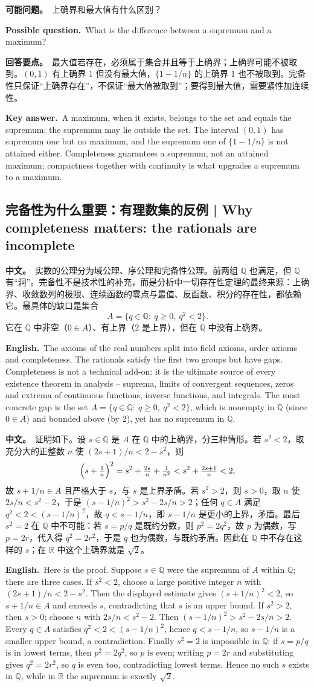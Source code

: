 \documentclass[UTF8,11pt,a4paper]{ctexart}
\newcommand{\BOTH}[2]{\par\noindent\textbf{中文。}\ #1\par\noindent\textbf{English.}\ #2\par}
\newcommand{\ASK}[4]{\begin{samepage}\par\noindent\textbf{可能问题。}\ #1\par\noindent\textbf{Possible question.}\ #2\par\noindent\textbf{回答要点。}\ #3\par\noindent\textbf{Key answer.}\ #4\medskip\end{samepage}}
\begin{document}
\ASK{上确界和最大值有什么区别？}{What is the difference between a supremum and a maximum?}{最大值若存在，必须属于集合并且等于上确界；上确界可能不被取到。$(0,1)$ 有上确界 $1$ 但没有最大值，$\{1-1/n\}$ 的上确界 $1$ 也不被取到。完备性只保证“上确界存在”，不保证“最大值被取到”；要得到最大值，需要紧性加连续性。}{A maximum, when it exists, belongs to the set and equals the supremum; the supremum may lie outside the set. The interval $(0,1)$ has supremum one but no maximum, and the supremum one of $\{1-1/n\}$ is not attained either. Completeness guarantees a supremum, not an attained maximum; compactness together with continuity is what upgrades a supremum to a maximum.}

\subsection{完备性为什么重要：有理数集的反例 | Why completeness matters: the rationals are incomplete}
\BOTH{实数的公理分为域公理、序公理和完备性公理。前两组 $\mathbb Q$ 也满足，但 $\mathbb Q$ 有“洞”。完备性不是技术性的补充，而是分析中一切存在性定理的最终来源：上确界、收敛数列的极限、连续函数的零点与最值、反函数、积分的存在性，都依赖它。最具体的缺口是集合
\[
A=\{q\in\mathbb Q:\ q\ge0,\ q^2<2\}.
\]
它在 $\mathbb Q$ 中非空（$0\in A$）、有上界（$2$ 是上界），但在 $\mathbb Q$ 中没有上确界。}{The axioms of the real numbers split into field axioms, order axioms and completeness. The rationals satisfy the first two groups but have gaps. Completeness is not a technical add-on: it is the ultimate source of every existence theorem in analysis -- suprema, limits of convergent sequences, zeros and extrema of continuous functions, inverse functions, and integrals. The most concrete gap is the set $A=\{q\in\mathbb Q:\ q\ge0,\ q^2<2\}$, which is nonempty in $\mathbb Q$ (since $0\in A$) and bounded above (by $2$), yet has no supremum in $\mathbb Q$.}
\BOTH{证明如下。设 $s\in\mathbb Q$ 是 $A$ 在 $\mathbb Q$ 中的上确界，分三种情形。若 $s^2<2$，取充分大的正整数 $n$ 使 $(2s+1)/n<2-s^2$，则
\[
\Bigl(s+\tfrac1n\Bigr)^2=s^2+\tfrac{2s}{n}+\tfrac1{n^2}<s^2+\tfrac{2s+1}{n}<2,
\]
故 $s+1/n\in A$ 且严格大于 $s$，与 $s$ 是上界矛盾。若 $s^2>2$，则 $s>0$，取 $n$ 使 $2s/n<s^2-2$，于是 $(s-1/n)^2>s^2-2s/n>2$；任何 $q\in A$ 满足 $q^2<2<(s-1/n)^2$，故 $q<s-1/n$，即 $s-1/n$ 是更小的上界，矛盾。最后 $s^2=2$ 在 $\mathbb Q$ 中不可能：若 $s=p/q$ 是既约分数，则 $p^2=2q^2$，故 $p$ 为偶数，写 $p=2r$，代入得 $q^2=2r^2$，于是 $q$ 也为偶数，与既约矛盾。因此在 $\mathbb Q$ 中不存在这样的 $s$；在 $\mathbb R$ 中这个上确界就是 $\sqrt2$。}{Here is the proof. Suppose $s\in\mathbb Q$ were the supremum of $A$ within $\mathbb Q$; there are three cases. If $s^2<2$, choose a large positive integer $n$ with $(2s+1)/n<2-s^2$. Then the displayed estimate gives $(s+1/n)^2<2$, so $s+1/n\in A$ and exceeds $s$, contradicting that $s$ is an upper bound. If $s^2>2$, then $s>0$; choose $n$ with $2s/n<s^2-2$. Then $(s-1/n)^2>s^2-2s/n>2$. Every $q\in A$ satisfies $q^2<2<(s-1/n)^2$, hence $q<s-1/n$, so $s-1/n$ is a smaller upper bound, a contradiction. Finally $s^2=2$ is impossible in $\mathbb Q$: if $s=p/q$ is in lowest terms, then $p^2=2q^2$, so $p$ is even; writing $p=2r$ and substituting gives $q^2=2r^2$, so $q$ is even too, contradicting lowest terms. Hence no such $s$ exists in $\mathbb Q$, while in $\mathbb R$ the supremum is exactly $\sqrt2$.}
\end{document}
